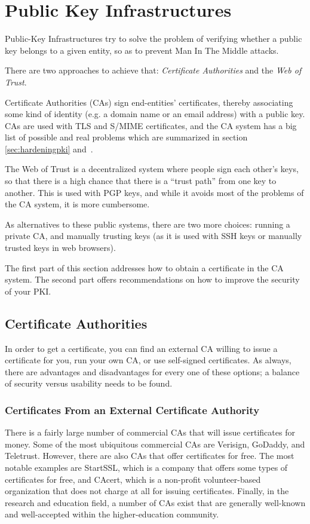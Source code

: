 \section{Public Key Infrastructures}
\label{section:PKIs}

Public-Key Infrastructures try to solve the problem of verifying
whether a public key belongs to a given entity, so as to prevent Man
In The Middle attacks.

There are two approaches to achieve that: \emph{Certificate Authorities}
and the \emph{Web of Trust}.

Certificate Authorities (CAs) sign end-entities' certificates, thereby
associating some kind of identity (e.g. a domain name or an email
address) with a public key. CAs are used with TLS and S/MIME
certificates, and the CA system has a big list of possible and real
problems which are summarized in section \ref{sec:hardeningpki} and~\cite{https13}.

The Web of Trust is a decentralized system where people sign each
other's keys, so that there is a high chance that there is a ``trust
path'' from one key to another. This is used with PGP keys, and while
it avoids most of the problems of the CA system, it is more
cumbersome.

As alternatives to these public systems, there are two more choices:
running a private CA, and manually trusting keys (as it is used with
SSH keys or manually trusted keys in web browsers).

The first part of this section addresses how to obtain a certificate
in the CA system. The second part offers recommendations on how to
improve the security of your PKI.

\subsection{Certificate Authorities}
\label{sec:cas}
In order to get a certificate, you can find an external CA willing to issue
a certificate for you, run your own CA, or use self-signed certificates.
As always, there are advantages and disadvantages for every one of these
options; a balance of security versus usability needs to be found.

\subsubsection{Certificates From an External Certificate Authority}
\label{sec:signcertfromca}

There is a fairly large number of commercial CAs that will issue
certificates for money.  Some of the most ubiquitous commercial CAs are
Verisign, GoDaddy, and Teletrust.  However, there are also CAs that offer
certificates for free.  The most notable examples are StartSSL, which is a
company that offers some types of certificates for free, and CAcert, which
is a non-profit volunteer-based organization that does not charge at all
for issuing certificates.  Finally, in the research and education field, a
number of CAs exist that are generally well-known and well-accepted within
the higher-education community.

